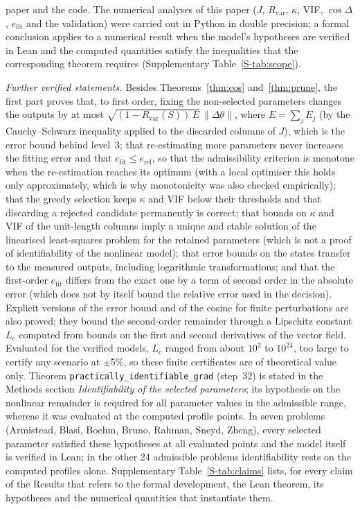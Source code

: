 \documentclass[pdflatex,sn-nature]{sn-jnl}
\theoremstyle{plain}
\begin{document}
paper and the code. The numerical analyses of this paper ($J$, $R_{\mathrm{var}}$, $\kappa$, VIF, $\cos\Delta$, $e_{\mathrm{fit}}$ and the validation) were carried out in Python in double precision; a formal conclusion applies to a numerical result when the model's hypotheses are verified in Lean and the computed quantities satisfy the inequalities that the corresponding theorem requires (Supplementary Table~\ref{S-tab:scope}).

\label{met:formal-further}\emph{Further verified statements.} Besides Theorems~\ref{thm:cos} and~\ref{thm:prune}, the first part proves that, to first order, fixing the non-selected parameters changes the outputs by at most $\sqrt{(1-R_{\mathrm{var}}(S))\,E}\,\|\Delta\theta\|$, where $E=\sum_j E_j$ (by the Cauchy--Schwarz inequality applied to the discarded columns of $J$), which is the error bound behind level~3; that re-estimating more parameters never increases the fitting error and that $e_{\mathrm{fit}}\le e_{\mathrm{rel}}$, so that the admissibility criterion is monotone when the re-estimation reaches its optimum (with a local optimiser this holds only approximately, which is why monotonicity was also checked empirically); that the greedy selection keeps $\kappa$ and VIF below their thresholds and that discarding a rejected candidate permanently is correct; that bounds on $\kappa$ and VIF of the unit-length columns imply a unique and stable solution of the linearised least-squares problem for the retained parameters (which is not a proof of identifiability of the nonlinear model); that error bounds on the states transfer to the measured outputs, including logarithmic transformations; and that the first-order $e_{\mathrm{fit}}$ differs from the exact one by a term of second order in the absolute error (which does not by itself bound the relative error used in the decision). Explicit versions of the error bound and of the cosine for finite perturbations are also proved; they bound the second-order remainder through a Lipschitz constant $L_c$ computed from bounds on the first and second derivatives of the vector field. Evaluated for the verified models, $L_c$ ranged from about $10^2$ to $10^{24}$, too large to certify any scenario at $\pm$5\%, so these finite certificates are of theoretical value only. Theorem \texttt{practically\_identifiable\_grad} (step~32) is stated in the Methods section \emph{Identifiability of the selected parameters}; its hypothesis on the nonlinear remainder is required for all parameter values in the admissible range, whereas it was evaluated at the computed profile points. In seven problems (Armistead, Blasi, Boehm, Bruno, Rahman, Sneyd, Zheng), every selected parameter satisfied these hypotheses at all evaluated points and the model itself is verified in Lean; in the other 24 admissible problems identifiability rests on the computed profiles alone. Supplementary Table~\ref{S-tab:claims} lists, for every claim of the Results that refers to the formal development, the Lean theorem, its hypotheses and the numerical quantities that instantiate them.
\end{document}
